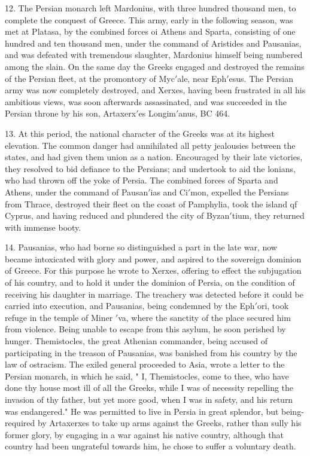 \documentclass[openany,a4paper]{memoir}
\begin{document}
12. The Persian monarch left Mardonius, with three hundred thousand men, to complete the conquest of Greece. This 
army, early in the following season, was met at Platasa, by 
the combined forces oi Athens and Sparta, consisting of one 
hundred and ten thousand men, under the command of Aristides and Pausanias, and was defeated with tremendous 
slaughter, Mardonius himself being numbered among the 
slain. On the same day the Greeks engaged and destroyed 
the remains of the Persian fleet, at the promontory of 
Myc$'$ale, near Eph$'$esus. The Persian army was now completely destroyed, and Xerxes, having been frustrated in all 
his ambitious views, was soon afterwards assassinated, and 
was succeeded in the Persian throne by his son, Artaxerx$'$es 
Longim$'$anus, BC 464. 

13. At this period, the national character of the Greeks 
was at its highest elevation. The common danger had annihilated all petty jealousies between the states, and had given 
them union as a nation. Encouraged by their late victories, 
they resolved to bid defiance to the Persians; and undertook 
to aid the lonians, who had thrown off the yoke of Persia. 
The combined forces of Sparta and Athens, under the command of Pausan$'$ias and Ci$'$mon, expelled the Persians from 
Thrace, destroyed their fleet on the coast of Pamphylia, took 
the island qf Cyprus, and having reduced and plundered the 
city of Byzan$'$tium, they returned with immense booty. 

14. Pausanias, who had borne so distinguished a part in 
the late war, now became intoxicated with glory and power, 
and aspired to the sovereign dominion of Greece. For this 
purpose he wrote to Xerxes, offering to effect the subjugation of his country, and to hold it under the dominion of 
Persia, on the condition of receiving his daughter in marriage. The treachery was detected before it could be carried 
into execution, and Pausanias, being condemned by the 
Eph$'$ori, took refuge in the temple of Miner $'$va, where the 
sanctity of the place secured him from violence. Being unable to escape from this asylum, he soon perished by hunger. 
Themistocles, the great Athenian commander, being accused 
of participating in the treason of Pausanias, was banished 
from his country by the law of ostracism. The exiled general 
proceeded to Asia, wrote a letter to the Persian monarch, in 
which he said, " I, Themistocles, come to thee, who have 
done thy house most ill of all the Greeks, while I was of 
necessity repelling the invasion of thy father, but yet more 
good, when I was in safety, and his return was endangered." 
He was permitted to live in Persia in great splendor, but 
being- required by Artaxerxes to take up arms against the 
Greeks, rather than sully his former glory, by engaging in a 
war against his native country, although that country had been 
ungrateful towards him, he chose to suffer a voluntary death. 
\end{document}
